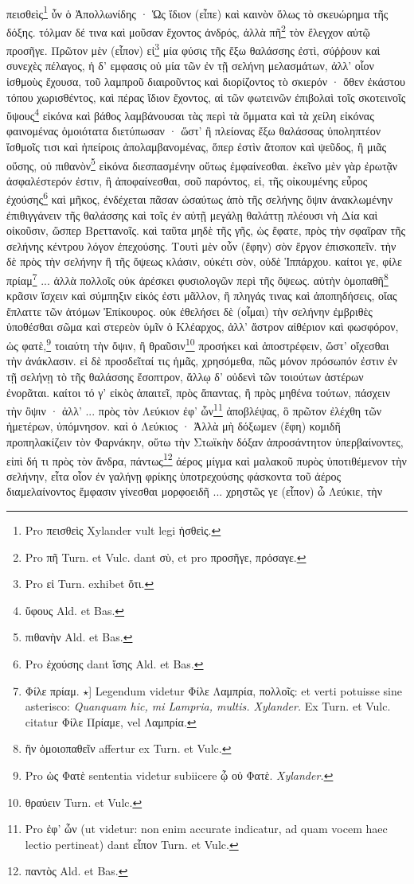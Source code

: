 \documentclass[a4paper, 11pt, oneside, polutonikogreek, german]{article}
\begin{document}
\paragraph{}
πεισθεὶς\footnote{Pro πεισθεὶς Xylander vult legi ἡσθεὶς.} ὖν ὁ Ἀπολλωνίδης · Ὡς ἴδιον (εἶπε) καὶ καινὸν ὅλως τὸ σκευώρημα τῆς δόξης. τόλμαν δέ τινα καὶ μοῦσαν ἔχοντος ἀνδρός, ἀλλὰ πῆ\footnote{Pro πῆ Turn. et Vulc. dant σὺ, et pro προσῆγε, πρόσαγε.} τὸν ἔλεγχον αὐτῷ προσῆγε. Πρῶτον μὲν (εἶπον) εἰ\footnote{Pro εἰ Turn. exhibet ὅτι.} μία φύσις τῆς ἔξω θαλάσσης ἐστὶ, σύῤῥουν καὶ συνεχὲς πέλαγος, ἡ δ' εμφασις οὐ μία τῶν ἐν τῇ σελήνη μελασμάτων, ἀλλ' οἷον ἰσθμοὺς ἔχουσα, τοῦ λαμπροῦ διαιροῦντος καὶ διορίζοντος τὸ σκιερόν · ὅθεν ἐκάστου τόπου χωρισθέντος, καὶ πέρας ἴδιον ἔχοντος, αἱ τῶν φωτεινῶν ἐπιβολαὶ τοῖς σκοτεινοῖς ὕψους\footnote{ὕφους Ald. et Bas.} εἰκόνα καὶ βάθος λαμβάνουσαι τὰς περὶ τὰ ὄμματα καὶ τὰ χείλη εἰκόνας φαινομένας ὁμοιότατα διετύπωσαν · ὥστ' ἢ πλείονας ἔξω θαλάσσας ὑποληπτέον ἴσθμοῖς τισι καὶ ἠπείροις ἀπολαμβανομένας, ὅπερ ἐστὶν ἄτοπον καὶ ψεῦδος, ἢ μιᾶς οὔσης, οὐ πιθανὸν\footnote{πιθανὴν Ald. et Bas.} εἰκόνα διεσπασμένην οὕτως ἐμφαίνεσθαι. ἐκεῖνο μὲν γὰρ ἐρωτᾷν ἀσφαλέστερόν ἐστιν, ἢ ἀποφαίνεσθαι, σοῦ παρόντος, εἰ, τῆς οἰκουμένης εὖρος ἐχούσης\footnote{Pro ἐχούσης dant ἴσης Ald. et Bas.} καὶ μῆκος, ἐνδέχεται πᾶσαν ὡσαύτως ἀπὸ τῆς σελήνης ὄψιν ἀνακλωμένην ἐπιθιγγάνειν τῆς θαλάσσης καὶ τοῖς ἐν αὐτῇ μεγάλῃ θαλάττῃ πλέουσι νὴ Δία καὶ οἰκοῦσιν, ὥσπερ Βρεττανοῖς. καὶ ταῦτα μηδὲ τῆς γῆς, ὡς ἔφατε, πρὸς τὴν σφαῖραν τῆς σελήνης κέντρου λόγον ἐπεχούσης. Τουτὶ μὲν οὖν (ἔφην) σὸν ἔργον ἐπισκοπεῖν. τὴν δὲ πρὸς τὴν σελήνην ἢ τῆς ὄψεως κλάσιν, οὐκέτι σὸν, οὐδὲ Ἱππάρχου. καίτοι γε, φίλε πρίαμ\footnote{Φίλε πρίαμ. $\star$] Legendum videtur Φίλε Λαμπρία, πολλοῖς: et verti potuisse sine asterisco: \emph{Quanquam hic, mi Lampria, multis. Xylander.} Ex Turn. et Vulc. citatur Φίλε Πρίαμε, vel Λαμπρία.} ... ἀλλὰ πολλοῖς οὐκ ἀρέσκει φυσιολογῶν περὶ τῆς ὄψεως. αὐτὴν ὁμοπαθῆ\footnote{ἣν ὁμοιοπαθεῖν affertur ex Turn. et Vulc.} κρᾶσιν ἴσχειν καὶ σύμπηξιν εἰκός ἐστι μᾶλλον, ἢ πληγάς τινας καὶ ἀποπηδήσεις, οἵας ἔπλαττε τῶν ἀτόμων Ἐπίκουρος. οὐκ ἐθελήσει δὲ (οἶμαι) τὴν σελήνην ἐμβριθὲς ὑποθέσθαι σῶμα καὶ στερεὸν ὑμῖν ὁ Κλέαρχος, ἀλλ' ἄστρον αἰθέριον καὶ φωσφόρον, ὡς φατὲ,\footnote{Pro ὡς Φατὲ sententia videtur subiicere ᾧ οὐ Φατὲ. \emph{Xylander.}} τοιαύτη τὴν ὄψιν, ἢ θραῦσιν\footnote{θραύειν Turn. et Vulc.} προσήκει καὶ ἀποστρέφειν, ὥστ' οἴχεσθαι τὴν ἀνάκλασιν. εἰ δὲ προσδεῖταί τις ἡμᾶς, χρησόμεθα, πῶς μόνον πρόσωπόν ἐστιν ἐν τῇ σελήνῃ τὸ τῆς θαλάσσης ἔσοπτρον, ἄλλῳ δ' οὐδενὶ τῶν τοιούτων ἀστέρων ἐνορᾶται. καίτοι τό γ' εἰκὸς ἀπαιτεῖ, πρὸς ἅπαντας, ἢ πρὸς μηθένα τούτων, πάσχειν τὴν ὂψιν · ἀλλ' ... πρὸς τὸν Λεύκιον ἐφ' ὧν\footnote{Pro ἐφ' ὧν (ut videtur: non enim accurate indicatur, ad quam vocem haec lectio pertineat) dant εἶπον Turn. et Vulc.} ἀποβλέψας, ὃ πρῶτον ἐλέχθη τῶν ἡμετέρων, ὑπόμνησον. καὶ ὁ Λεύκιος · Ἀλλὰ μὴ δόξωμεν (ἔφη) κομιδῆ προπηλακίζειν τὸν Φαρνάκην, οὕτω τὴν Στωϊκὴν δόξαν ἀπροσάντητον ὑπερβαίνοντες, εἰπὶ δή τι πρὸς τὸν ἄνδρα, πάντως\footnote{παντὸς Ald. et Bas.} ἀέρος μίγμα καὶ μαλακοῦ πυρὸς ὑποτιθέμενον τὴν σελήνην, εἶτα οἷον ἐν γαλήνῃ φρίκης ὑποτρεχούσης φάσκοντα τοῦ ἀέρος διαμελαίνοντος ἔμφασιν γίνεσθαι μορφοειδῆ ... χρηστῶς γε (εἶπον) ὦ Λεύκιε, τὴν 
\end{document}

